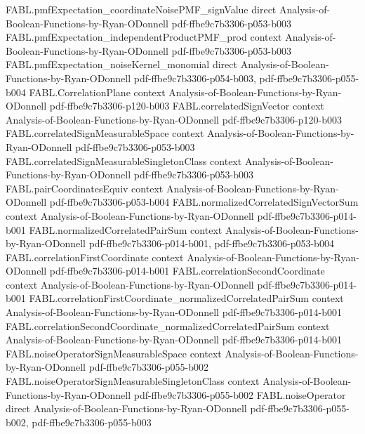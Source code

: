 \begin{theorem}
\proofstep
  {FABL.pmfExpectation_coordinateNoisePMF_signValue}
  {direct}
  {Analysis-of-Boolean-Functions-by-Ryan-ODonnell}
  {pdf-ffbe9c7b3306-p053-b003}
\proofstep
  {FABL.pmfExpectation_independentProductPMF_prod}
  {context}
  {Analysis-of-Boolean-Functions-by-Ryan-ODonnell}
  {pdf-ffbe9c7b3306-p053-b003}
\proofstep
  {FABL.pmfExpectation_noiseKernel_monomial}
  {direct}
  {Analysis-of-Boolean-Functions-by-Ryan-ODonnell}
  {pdf-ffbe9c7b3306-p054-b003,
    pdf-ffbe9c7b3306-p055-b004}
\proofstep
  {FABL.CorrelationPlane}
  {context}
  {Analysis-of-Boolean-Functions-by-Ryan-ODonnell}
  {pdf-ffbe9c7b3306-p120-b003}
\proofstep
  {FABL.correlatedSignVector}
  {context}
  {Analysis-of-Boolean-Functions-by-Ryan-ODonnell}
  {pdf-ffbe9c7b3306-p120-b003}
\proofstep
  {FABL.correlatedSignMeasurableSpace}
  {context}
  {Analysis-of-Boolean-Functions-by-Ryan-ODonnell}
  {pdf-ffbe9c7b3306-p053-b003}
\proofstep
  {FABL.correlatedSignMeasurableSingletonClass}
  {context}
  {Analysis-of-Boolean-Functions-by-Ryan-ODonnell}
  {pdf-ffbe9c7b3306-p053-b003}
\proofstep
  {FABL.pairCoordinatesEquiv}
  {context}
  {Analysis-of-Boolean-Functions-by-Ryan-ODonnell}
  {pdf-ffbe9c7b3306-p053-b004}
\proofstep
  {FABL.normalizedCorrelatedSignVectorSum}
  {context}
  {Analysis-of-Boolean-Functions-by-Ryan-ODonnell}
  {pdf-ffbe9c7b3306-p014-b001}
\proofstep
  {FABL.normalizedCorrelatedPairSum}
  {context}
  {Analysis-of-Boolean-Functions-by-Ryan-ODonnell}
  {pdf-ffbe9c7b3306-p014-b001,
    pdf-ffbe9c7b3306-p053-b004}
\proofstep
  {FABL.correlationFirstCoordinate}
  {context}
  {Analysis-of-Boolean-Functions-by-Ryan-ODonnell}
  {pdf-ffbe9c7b3306-p014-b001}
\proofstep
  {FABL.correlationSecondCoordinate}
  {context}
  {Analysis-of-Boolean-Functions-by-Ryan-ODonnell}
  {pdf-ffbe9c7b3306-p014-b001}
\proofstep
  {FABL.correlationFirstCoordinate_normalizedCorrelatedPairSum}
  {context}
  {Analysis-of-Boolean-Functions-by-Ryan-ODonnell}
  {pdf-ffbe9c7b3306-p014-b001}
\proofstep
  {FABL.correlationSecondCoordinate_normalizedCorrelatedPairSum}
  {context}
  {Analysis-of-Boolean-Functions-by-Ryan-ODonnell}
  {pdf-ffbe9c7b3306-p014-b001}
\proofstep
  {FABL.noiseOperatorSignMeasurableSpace}
  {context}
  {Analysis-of-Boolean-Functions-by-Ryan-ODonnell}
  {pdf-ffbe9c7b3306-p055-b002}
\proofstep
  {FABL.noiseOperatorSignMeasurableSingletonClass}
  {context}
  {Analysis-of-Boolean-Functions-by-Ryan-ODonnell}
  {pdf-ffbe9c7b3306-p055-b002}
\proofstep
  {FABL.noiseOperator}
  {direct}
  {Analysis-of-Boolean-Functions-by-Ryan-ODonnell}
  {pdf-ffbe9c7b3306-p055-b002,
    pdf-ffbe9c7b3306-p055-b003}
\proofstep

\end{theorem}
